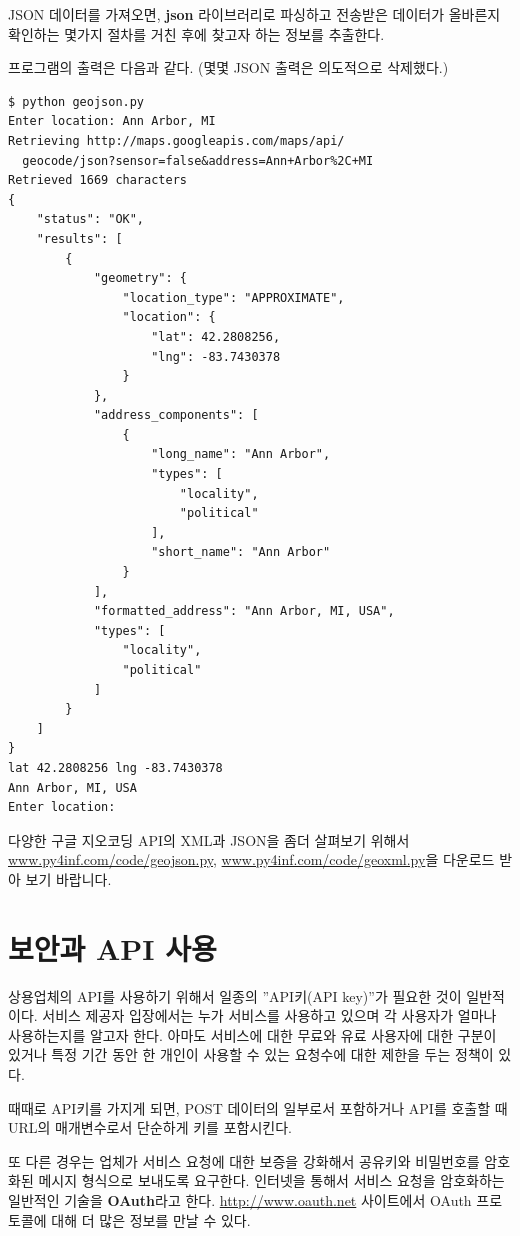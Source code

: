 JSON 데이터를 가져오면, {\bf json} 라이브러리로 파싱하고 전송받은 데이터가 올바른지 확인하는 몇가지 절차를 거친 후에 찾고자 하는 정보를 추출한다.

프로그램의 출력은 다음과 같다. (몇몇 JSON 출력은 의도적으로 삭제했다.)

\beforeverb
\begin{verbatim}
$ python geojson.py
Enter location: Ann Arbor, MI
Retrieving http://maps.googleapis.com/maps/api/
  geocode/json?sensor=false&address=Ann+Arbor%2C+MI
Retrieved 1669 characters
{
    "status": "OK", 
    "results": [
        {
            "geometry": {
                "location_type": "APPROXIMATE", 
                "location": {
                    "lat": 42.2808256, 
                    "lng": -83.7430378
                }
            }, 
            "address_components": [
                {
                    "long_name": "Ann Arbor", 
                    "types": [
                        "locality", 
                        "political"
                    ], 
                    "short_name": "Ann Arbor"
                } 
            ], 
            "formatted_address": "Ann Arbor, MI, USA", 
            "types": [
                "locality", 
                "political"
            ]
        }
    ]
}
lat 42.2808256 lng -83.7430378
Ann Arbor, MI, USA
Enter location:
\end{verbatim}
\afterverb
%

다양한 구글 지오코딩 API의 XML과 JSON을 좀더 살펴보기 위해서 \url{www.py4inf.com/code/geojson.py},
\url{www.py4inf.com/code/geoxml.py}을 다운로드 받아 보기 바랍니다.

\section{보안과 API 사용}

상용업체의 API를 사용하기 위해서 일종의 ''API키(API key)''가 필요한 것이 일반적이다.
서비스 제공자 입장에서는 누가 서비스를 사용하고 있으며 각 사용자가 얼마나 사용하는지를 알고자 한다.
아마도 서비스에 대한 무료와 유료 사용자에 대한 구분이 있거나 특정 기간 동안 한 개인이 사용할 수 있는
요청수에 대한 제한을 두는 정책이 있다. 

때때로 API키를 가지게 되면, POST 데이터의 일부로서 포함하거나 API를 호출할 때
URL의 매개변수로서 단순하게 키를 포함시킨다.

또 다른 경우는 업체가 서비스 요청에 대한 보증을 강화해서 공유키와 비밀번호를 암호화된 메시지 형식으로
보내도록 요구한다. 인터넷을 통해서 서비스 요청을 암호화하는 일반적인 기술을 {\bf OAuth}라고 한다.
\url{http://www.oauth.net} 사이트에서 OAuth 프로토콜에 대해 더 많은 정보를 만날 수 있다. 

